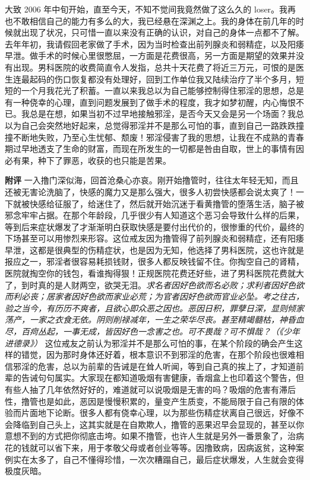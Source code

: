\begin{case}
    大致 2006 年中旬开始，直至今天，不知不觉间我竟然做了这么久的 loser。我再也不敢相信自己的能力有多么的大，我已经悬在深渊之上。我的身体在前几年的时候就出现了状况，只可惜一直以来没有正确的认识，对自己的身体一点都不了解。去年年初，我请假回老家做了手术，因为当时检查出前列腺炎和弱精症，以及阳痿早泄。做手术的时候心里很憋屈，一方面是花费很高，另一方面是期望的效果并没有出现。男科医院的收费简直令人发指，总共十天花费了将近三万元，可恨的是医生连最起码的伤口恢复都没有处理好，回到工作单位我又陆续治疗了半个多月，短短的一个月我花光了积蓄。一直以来我总以为自己能够控制得住邪淫的思想，总是有一种侥幸的心理，直到问题发展到了做手术的程度，我才如梦初醒，内心悔恨不已。我总是在想，如果当初不过早地接触邪淫，是否今天又会是另一个场面？我总以为自己会突然地好起来，总觉得邪淫并不是那么可怕的事，直到自己一路跌跌撞撞不断地失败，乃至心生忧郁、颓废！邪淫侵害了我的思想，让我在不成熟的青春期过早地透支了生命的财富，而现在所发生的一切都是咎由自取，世上的事情有因必有果，种下了罪恶，收获的也只能是苦果。

    \textbf{附评} 一入撸门深似海，回首沧桑心亦哀。刚开始撸管时，往往太年轻无知，而且还被无害论洗脑了，快感的魔力又是那么强大，很多人初尝快感都会说太爽了！一下就被快感给征服了，给迷住了，然后就开始沉迷于看黄撸管的堕落生活，脑子被邪念牢牢占据。在那个年龄段，几乎很少有人知道这个恶习会导致什么样的后果，等到后来症状爆发了才渐渐明白获取快感是要付出代价的，很惨重的代价，最终的下场甚至可以用惨烈来形容。这位戒友因为撸管得了前列腺炎和弱精症，还有阳痿早泄，这都是很典型的伤精症状，也是因为无知，他选择了男科医院，这也许就是报应之一，邪淫者很容易耗损钱财，很多人都反映钱留不住。你掏空自己的肾精，医院就掏空你的钱包，看谁掏得狠！正规医院花费还好些，进了男科医院花费就大了，到时真的是人财两空，欲哭无泪。\textit{求名者因好色欲而名必败；求利者因好色欲而利必丧；居家者因好色欲而家业必荒；为官者因好色欲而官业必坠。考之往古，验之当今，有历历不爽者，且欲心即众恶之因也。恶因日积，罪孽日深，显则倾家荡产，一家之衣食无依。阴则削禄减年，一生之荣华尽丧。甚至精竭髓枯，神昏血尽，百疴丛起，一事无成，皆因好色一念害之也。可不畏哉？可不惧哉？（《少年进德录》）} 这位戒友之前认为邪淫并不是那么可怕的事，在某个阶段的确会产生这样的错觉，因为那时身体还好着，根本意识不到邪淫的危害，在那个阶段也很难相信邪淫的危害，总以为前辈的告诫是在耸人听闻，等到自己真的挨上了，才知道前辈的告诫句句属实。大家现在都知道吸烟有害健康，香烟盒上也印着这个警告，但有些人抽了几年依然好好的，难道就可以说吸烟是无害的吗？吸烟的危害有滞后性，撸管也是如此，恶因是慢慢积累的，量变产生质变，不能局限于自己有限的体验而片面地下论断。很多人都有侥幸心理，以为那些伤精症状离自己很远，好像不会降临到自己头上，这其实就是在自欺欺人，撸管的恶果迟早会显现的，甚至以你意想不到的方式把你彻底击垮。如果不撸管，也许人生就是另外一番景象了，治病花的钱就可以省下来，用于孝敬父母或者创业等等。因撸致病，因病返贫，这种案例实在太多了，自己不懂得珍惜，一次次糟蹋自己，最后症状爆发，人生就会变得极度灰暗。
\end{case}

